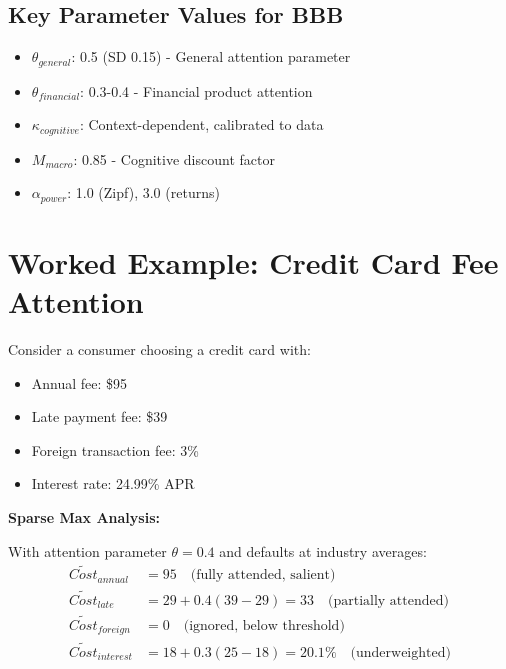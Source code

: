 \subsection{Key Parameter Values for BBB}

\begin{tcolorbox}[colback=green!5!white, colframe=green!75!black, title=Gabaix Parameters for BBB Repository]
\begin{itemize}
    \item $\theta_{general}$: 0.5 (SD 0.15) - General attention parameter
    \item $\theta_{financial}$: 0.3-0.4 - Financial product attention
    \item $\kappa_{cognitive}$: Context-dependent, calibrated to data
    \item $M_{macro}$: 0.85 - Cognitive discount factor
    \item $\alpha_{power}$: 1.0 (Zipf), 3.0 (returns)
\end{itemize}
\end{tcolorbox}

\section{Worked Example: Credit Card Fee Attention}

Consider a consumer choosing a credit card with:
\begin{itemize}
    \item Annual fee: \$95
    \item Late payment fee: \$39
    \item Foreign transaction fee: 3\%
    \item Interest rate: 24.99\% APR
\end{itemize}

\textbf{Sparse Max Analysis:}

With attention parameter $\theta = 0.4$ and defaults at industry averages:
\begin{align}
\tilde{Cost}_{annual} &= 95 \quad \text{(fully attended, salient)} \\
\tilde{Cost}_{late} &= 29 + 0.4(39 - 29) = 33 \quad \text{(partially attended)} \\
\tilde{Cost}_{foreign} &= 0 \quad \text{(ignored, below threshold)} \\
\tilde{Cost}_{interest} &= 18 + 0.3(25 - 18) = 20.1\% \quad \text{(underweighted)}
\end{align}

